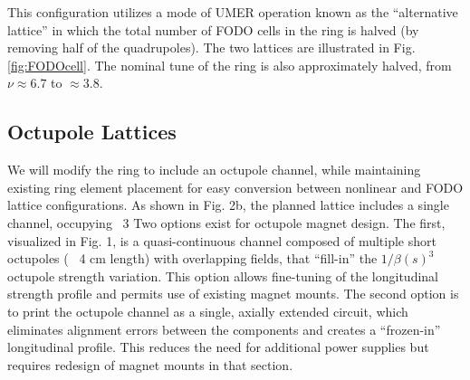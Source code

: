 This configuration utilizes a mode of UMER operation known as the “alternative lattice” in which the total number of FODO cells in the ring is halved (by removing half of the quadrupoles).  The two lattices are illustrated in Fig. \ref{fig:FODOcell}. The nominal tune of the ring is also approximately halved, from $\nu \approx 6.7$ to $\approx 3.8$.



\subsection{Octupole Lattices}

We will modify the ring to include an octupole channel, while maintaining existing ring element placement for easy conversion between nonlinear and FODO lattice configurations. As shown in Fig. 2b, the planned lattice includes a single channel, occupying ~3%
Two options exist for octupole magnet design. The first, visualized in Fig. 1, is a quasi-continuous channel composed of multiple short octupoles (~ 4 cm length) with overlapping fields, that “fill-in” the $1/\beta(s)^3$ octupole strength variation. This option allows fine-tuning of the longitudinal strength profile and permits use of existing magnet mounts. The second option is to print the octupole channel as a single, axially extended circuit, which eliminates alignment errors between the components and creates a “frozen-in” longitudinal profile. This reduces the need for additional power supplies but requires redesign of magnet mounts in that section.
